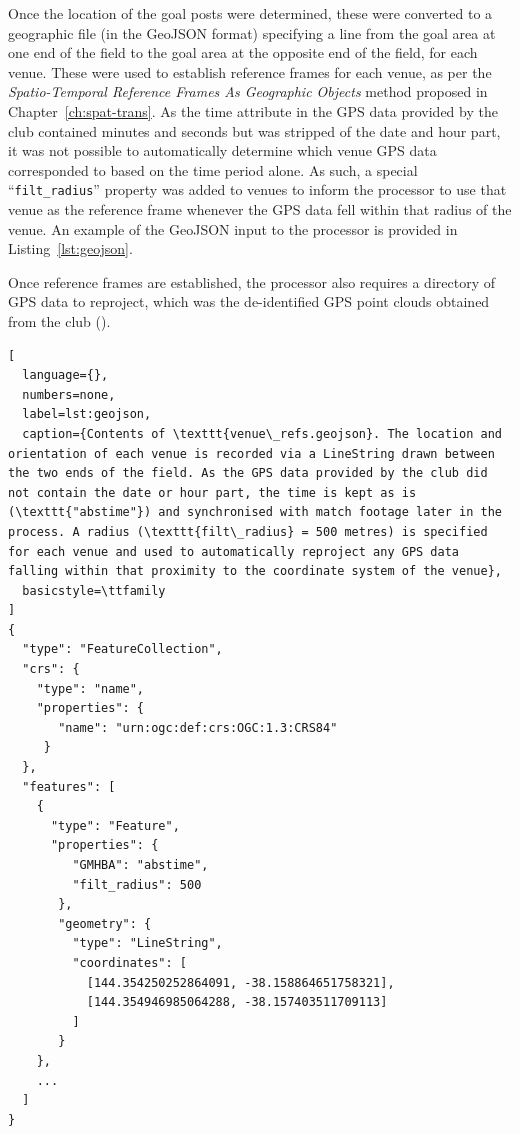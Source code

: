 Once the location of the goal posts were determined, these were converted to a geographic file (in the GeoJSON format) specifying a line from the goal area at one end of the field to the goal area at the opposite end of the field, for each venue. These were used to establish reference frames for each venue, as per the \textit{Spatio-Temporal Reference Frames As Geographic Objects} method \cite{Simmons2017} proposed in Chapter~\ref{ch:spat-trans}. As the time attribute in the GPS data provided by the \afl{} club contained minutes and seconds but was stripped of the date and hour part, it was not possible to automatically determine which venue GPS data corresponded to based on the time period alone. As such, a special ``\texttt{filt\_radius}'' property was added to venues to inform the processor to use that venue as the reference frame whenever the GPS data fell within that radius of the venue. An example of the GeoJSON input to the processor is provided in Listing~\ref{lst:geojson}.

Once reference frames are established, the processor also requires a directory of GPS data to reproject, which was the de-identified GPS point clouds obtained from the club ().

\newpage{}

\begin{lstlisting}[
  language={},
  numbers=none,
  label=lst:geojson,
  caption={Contents of \texttt{venue\_refs.geojson}. The location and orientation of each venue is recorded via a LineString drawn between the two ends of the field. As the GPS data provided by the club did not contain the date or hour part, the time is kept as is (\texttt{"abstime"}) and synchronised with match footage later in the process. A radius (\texttt{filt\_radius} = 500 metres) is specified for each venue and used to automatically reproject any GPS data falling within that proximity to the coordinate system of the venue},
  basicstyle=\ttfamily
]
{
  "type": "FeatureCollection",
  "crs": {
    "type": "name",
    "properties": {
       "name": "urn:ogc:def:crs:OGC:1.3:CRS84"
     }
  },
  "features": [
    {
      "type": "Feature",
      "properties": {
         "GMHBA": "abstime",
         "filt_radius": 500
       },
       "geometry": {
         "type": "LineString",
         "coordinates": [
           [144.354250252864091, -38.158864651758321],
           [144.354946985064288, -38.157403511709113]
         ]
       }
    },
    ...
  ]
}
\end{lstlisting}

